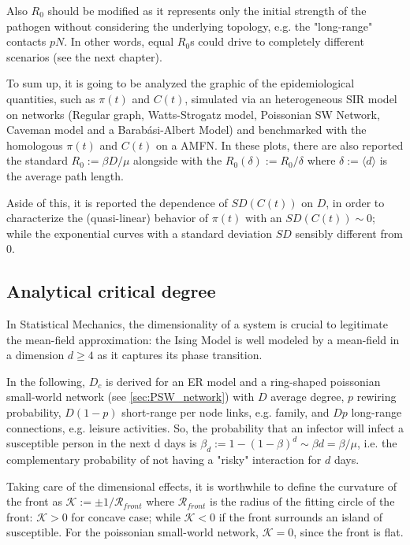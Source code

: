 \documentclass[a4paper,10pt,twoside]{book} %
\theoremstyle{definition}
\begin{document}
Also $R_0$ should be modified as it represents only the initial strength of the pathogen without considering the underlying topology, e.g. the "long-range" contacts $pN$. In other words, equal $R_0$s could drive to completely different scenarios (see the next chapter).

To sum up, it is going to be analyzed the graphic of the epidemiological quantities, such as $\pi(t)$ and $C(t)$, simulated via an heterogeneous SIR model on networks (Regular graph, Watts-Strogatz model, Poissonian SW Network, Caveman model and a Barabási-Albert Model) and benchmarked with the homologous $\pi(t)$ and $C(t)$ on a AMFN. In these plots, there are also reported the standard $R_0 := \beta D / \mu$ alongside with the $R_0(\delta) := R_0 /\delta$ where $\delta:=\langle d \rangle $ is the average path length.

Aside of this, it is reported the dependence of $SD(C(t))$ on $D$, in order to characterize the (quasi-linear) behavior of $\pi(t)$ with an $SD(C(t)) \sim 0$; while the exponential curves with a standard deviation $SD$ sensibly different from $0$.

\subsection*{Analytical critical degree}
In Statistical Mechanics, the dimensionality of a system is crucial to legitimate the mean-field approximation: the Ising Model is well modeled by a mean-field in a dimension $d \geq 4$ as it captures its phase transition.

In the following, $D_c$ is derived for an ER model and a ring-shaped poissonian small-world network (see \autoref{sec:PSW_network}) with $D$ average degree, $p$ rewiring probability, $D(1-p)$ short-range per node links, e.g. family, and $Dp$ long-range connections, e.g. leisure activities. So, the probability that an infector will infect a susceptible person in the next d days is $\beta_d:= 1-(1-\beta)^d \sim \beta d = \beta/\mu$, i.e. the complementary probability of not having a "risky" interaction for $d$ days.

Taking care of the dimensional effects, it is worthwhile to define the curvature of the front as $ \mathcal{K}:= \pm 1/\mathcal{R}_{front}$ where $\mathcal{R}_{front}$ is the radius of the fitting circle of the front: $\mathcal{K}>0$ for concave case; while $\mathcal{K}<0$ if the front surrounds an island of susceptible. For the poissonian small-world network, $\mathcal{K} = 0$, since the front is flat.    
\end{document}
